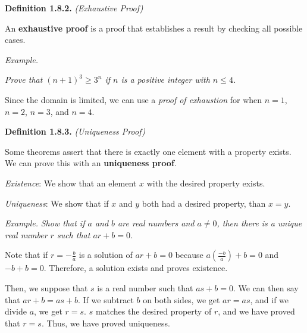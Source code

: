 \documentclass[12pt, letterpaper]{article}
\begin{document}
\textbf{Definition 1.8.2.} \textit{(Exhaustive Proof)}
\medskip

An \textbf{exhaustive proof} is a proof that establishes a result by checking all possible cases.
\bigskip

\textit{Example.}
\medskip

\textit{Prove that $ (n + 1)^3 \geq 3^n $ if $ n $ is a positive integer with $ n \leq 4 $.}
\medskip

Since the domain is limited, we can use a \textit{proof of exhaustion} for when $ n = 1 $, $ n = 2 $, $ n = 3 $, and $ n = 4 $. %
\medskip

\bigskip
\bigskip

\textbf{Definition 1.8.3.} \textit{(Uniqueness Proof)}
\medskip

Some theorems assert that there is exactly one element with a property exists. We can prove this with an \textbf{uniqueness proof}.
\medskip

\textit{Existence}: We show that an element $ x $ with the desired property exists.

\textit{Uniqueness}: We show that if $ x $ and $ y $ both had a desired property, than $ x = y $.
\bigskip

\textit{Example.}
\medskip
\textit{Show that if $ a $ and $ b $ are real numbers and $ a \neq 0 $, then there is a unique real number $ r $ such that $ ar + b = 0 $.}
\medskip

Note that if $ r = -\frac{b}{a} $ is a solution of $ ar + b = 0 $ because $ a (\frac{-b}{a}) + b = 0 $ and $ -b + b = 0 $. Therefore, a solution exists and proves existence.
\medskip

Then, we suppose that $ s $ is a real number such that $ as + b = 0 $. We can then say that $ ar + b = as + b $. If we subtract $ b $ on both sides, we get $ ar = as $, and if we divide $ a $, we get $ r = s $. $ s $ matches the desired property of $ r $, and we have proved that $ r = s $. Thus, we have proved uniqueness.

\bigskip
\bigskip
\end{document}
